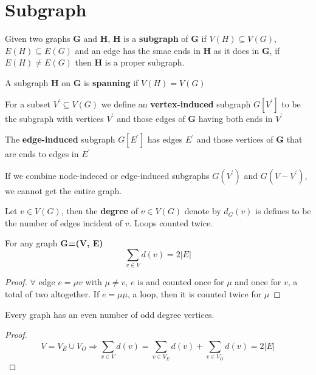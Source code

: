 	\section{Subgraph}

		Given two graphs \textbf{G} and \textbf{H}, \textbf{H} is a \textbf{subgraph} of \textbf{G} if $V(H)\subseteq V(G)$, $E(H)\subseteq E(G)$ and an edge has the smae ends in \textbf{H} as it does in \textbf{G}, if $E(H)\neq E(G)$ then \textbf{H} is a proper subgraph.

		A subgraph \textbf{H} on \textbf{G} is \textbf{spanning} if $V(H) = V(G)$

		For a subset $V^{'}\subseteq V(G)$ we define an \textbf{vertex-induced} subgraph $G[V^{'}]$ to be the subgraph with vertices $V^{'}$ and those edges of \textbf{G} having both ends in $V^{'}$

		The \textbf{edge-induced} subgraph $G[E^{'}]$ has edges $E^{'}$ and those vertices of \textbf{G} that are ends to edges in \textbf{$E^{'}$}

		If we combine node-indeced or edge-induced subgraphs $G(V^{'})$ and $G(V - V^{'})$, we cannot get the entire graph.

		Let $v\in V(G)$, then the \textbf{degree} of $v\in V(G)$ denote by $d_G(v)$ is defines to be the number of edges incident of $v$. Loops counted twice.

		\begin{theorem}
			For any graph \textbf{G=(V, E)}
			\begin{equation}
				\sum_{v\in V}d(v) = 2|E|
			\end{equation}			
		\end{theorem}

		\begin{proof}
			$\forall$ edge $e=\mu v$ with $\mu \neq v$, $e$ is  and counted once for $\mu$ and once for $v$, a total of two altogether. If $e=\mu \mu$, a loop, then it is counted twice for $\mu$			
		\end{proof}

		\begin{corollary}
			Every graph has an even number of odd degree vertices.
		\end{corollary}

		\begin{proof}
			\begin{equation}
				V = V_E\cup V_O \Rightarrow 
				\sum_{v\in V}d(v) = \sum_{v\in V_E} d(v) + \sum_{v\in V_O}d(v) = 2|E|
			\end {equation}			
		\end{proof}


